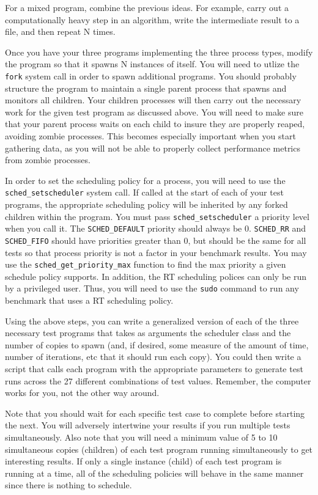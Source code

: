 \documentclass[12pt]{article}
\begin{document}
For a mixed program, combine the previous ideas. For example, carry out a
computationally heavy step in an algorithm, write the intermediate
result to a file, and then repeat N times.

Once you have your three programs implementing the three process types,
modify the program so that it spawns N instances of itself. You will
need to utlize the \texttt{fork} system call in order to spawn
additional programs. You should probably structure the program to
maintain a single parent process that spawns and monitors all
children. Your children processes will then carry out the necessary
work for the given test program as discussed above.
You will need to make sure that your parent process waits on
each child to insure they are properly reaped, avoiding zombie
processes. This becomes especially important when you start gathering data,
as you will not be able to properly collect performance metrics from
zombie processes. 

In order to set the scheduling policy for a process, you will need to
use the \texttt{sched\_setscheduler} system call. If called at the start
of each of your test programs, the appropriate scheduling policy
will be inherited by any forked children within the program. You must pass
\texttt{sched\_setscheduler} a priority level when you call it.
The \texttt{SCHED\_DEFAULT} priority should always be
0. \texttt{SCHED\_RR} and \texttt{SCHED\_FIFO} should have priorities
greater than 0, but should be the same for all tests so that process
priority is not a factor in your benchmark results. You may use the
\texttt{sched\_get\_priority\_max} function to find the max priority a
given schedule policy supports. In addition, the RT scheduling
polices can only be run by a privileged user. Thus, you will need to
use the \texttt{sudo} command to run any benchmark that uses a RT
scheduling policy.

Using the above steps, you can write a generalized version of each
of the three necessary test programs that takes as arguments the
scheduler class and
the number of copies to spawn (and, if desired, some measure of the
amount of time, number of iterations, etc that it should run each copy).
You could then write a script that calls each program with the
appropriate parameters to generate test runs
across the 27 different combinations of test values. Remember, the
computer works for you, not the other way around.

Note that you
should wait for each specific test case to complete before
starting the next. You will adversely intertwine your results if you
run multiple tests simultaneously. Also note that you will
need a minimum value of 5 to 10 simultaneous copies (children) of each test
program running simultaneously to get interesting results. If only a
single instance (child) of each test program is running at a time, all of the
scheduling policies will behave in the same manner since there is
nothing to schedule.
\end{document}
